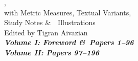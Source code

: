 \begin{center}
{{,\\
with Metric Measures, Textual Variants,\\
Study Notes \&\ \totalfigures\ Illustrations\\[2ex]
}
Edited by Tigran Aivazian\\[2ex]
}%
\ifmultivol
\LARGE\bfseries\itshape
\ifvoli Volume I: Foreword \&\ Papers 1--96\\\fi
\ifvolii Volume II: Papers 97--196\\\fi
\fi
{}
\titlesepbig\\
\end{center}


\newpage


